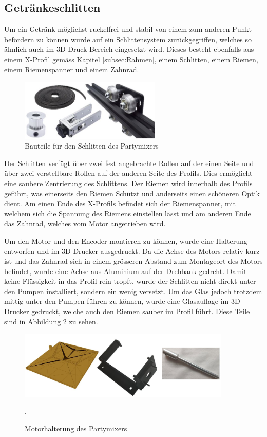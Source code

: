 \subsection{Getränkeschlitten}
\label{subsec:Getränkeschlitten}

Um ein Getränk möglichst ruckelfrei und stabil von einem zum anderen Punkt befördern zu können wurde auf ein Schlittensystem zurückgegriffen, welches so ähnlich auch im 3D-Druck Bereich eingesetzt wird. Dieses besteht ebenfalls aus einem X-Profil gemäss Kapitel \ref{subsec:Rahmen}, einem Schlitten, einem Riemen, einem Riemenspanner und einem Zahnrad. 

\begin{figure}[H]
	\centering
	\includegraphics[width=0.6\textwidth]{graphics/Schlitten}
	\caption{Bauteile für den Schlitten des Partymixers \cite{shop4649026_store_2020_nodate} \cite{super_3d_technology_co_limited_2020_nodate} \cite{super_3d_technology_co_limited_1set_nodate} \cite{super_3d_technology_co_limited_2gtgt2_nodate}}
	\label{fig:Schlitten}
\end{figure}

Der Schlitten verfügt über zwei fest angebrachte Rollen auf der einen Seite und über zwei verstellbare Rollen auf der anderen Seite des Profils. Dies ermöglicht eine saubere Zentrierung des Schlittens. Der Riemen wird innerhalb des Profils geführt, was einerseits den Riemen Schützt und anderseits einen schöneren Optik dient. Am einen Ende des X-Profils befindet sich der Riemenspanner, mit welchem sich die Spannung des Riemens einstellen lässt und am anderen Ende das Zahnrad, welches vom Motor angetrieben wird. 

Um den Motor und den Encoder montieren zu können, wurde eine Halterung entworfen und im 3D-Drucker ausgedruckt. Da die Achse des Motors relativ kurz ist und das Zahnrad sich in einem grösseren Abstand zum Montageort des Motors befindet, wurde eine Achse aus Aluminium auf der Drehbank gedreht.  Damit keine Flüssigkeit in das Profil rein tropft, wurde der Schlitten nicht direkt unter den Pumpen installiert, sondern ein wenig versetzt. Um das Glas jedoch trotzdem mittig unter den Pumpen führen zu können, wurde eine Glasauflage im 3D-Drucker gedruckt, welche auch den Riemen sauber im Profil führt. Diese Teile sind in Abbildung \ref{fig:Motorhalterung} zu sehen.    

\begin{figure}[H]
	\centering
	\includegraphics[width=0.9\textwidth]{graphics/Motorhalterung}
	\caption{Motorhalterung des Partymixers}.
	\label{fig:Motorhalterung}
\end{figure} 